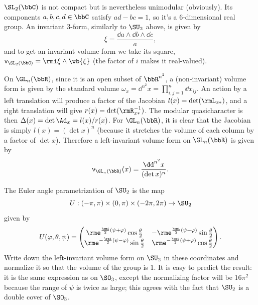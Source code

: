 \begin{example}
    $\SL_2(\bbC)$ is not compact but is nevertheless unimodular (obviously). Its components $a,b,c,d\in\bbC$ satisfy $ad-bc=1$, so it's a 6-dimensional real group. An invariant 3-form, similarly to $\SU_2$ above, is given by
    \[\xi=\frac{\dd a\wedge\dd b\wedge \dd c}{a},\]
    and to get an invariant volume form we take its square, $\mathsf{v}_{\SL_2(\bbC)}=\rmi\xi\wedge\wb{\xi}$ (the factor of $i$ makes it real-valued).
\end{example}

\begin{example}
    On $\GL_n(\bbR)$, since it is an open subset of $\bbR^{n^2}$, a (non-invariant) volume form is given by the standard volume $\omega_x=\dd^{n^2} x=\prod_{i,j=1}^n\dd x_{ij}$. An action by a left translation will produce a factor of the Jacobian $l(x)=\det(\rmL_{x\ast})$, and a right translation will give $r(x)=\det(\rmR_{x\ast }^{-1})$. The modular quasicharacter is then $\Delta(x)=\det\Ad_x=l(x)/r(x)$. For $\GL_n(\bbR)$, it is clear that the Jacobian is simply $l(x)=(\det x)^n$ (because it stretches the volume of each column by a factor of $\det x$). Therefore a left-invariant volume form on $\GL_n(\bbR)$ is given by
    \[\mathsf{v}_{\GL_n(\bbR)}(x)=\frac{\dd^{n^2} x}{(\det x)^n}.\]
\end{example}


\begin{xca}
    The Euler angle parametrization of $\SU_2$ is the map
    \[U:(-\pi,\pi)\times(0,\pi)\times(-2\pi,2\pi)\to \SU_2\]
    given by
    \[U(\varphi,\theta,\psi)=
    \begin{pmatrix}
        \rme^{\frac \rmi 2(\psi+\varphi)}\cos\frac{\theta}{2} &  -\rme^{\frac \rmi 2(\psi-\varphi)}\sin\frac{\theta}{2}\\
         \rme^{-\frac \rmi 2(\psi-\varphi)}\sin\frac{\theta}{2} &  \rme^{-\frac \rmi 2(\psi+\varphi)}\cos\frac{\theta}{2}
    \end{pmatrix}.\]
    Write down the left-invariant volume form on $\SU_2$ in these coordinates and normalize it so that the volume of the group is $1$. It is easy to predict the result: it is the same expression as on $\SO_3$, except the normalizing factor will be $16\pi^2$ because the range of $\psi$ is twice as large; this agrees with the fact that $\SU_2$ is a double cover of $\SO_3$.
\end{xca}







